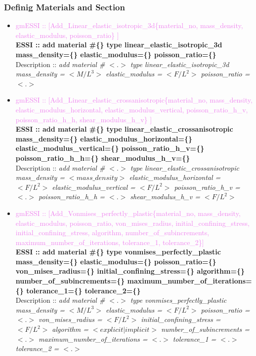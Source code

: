 \documentclass[11pt]{article}
\begin{document}
\subsubsection{Definig Materials and Section}

    \begin{itemize}

      \item \textcolor{violet}{gmESSI :: [Add\_Linear\_elastic\_isotropic\_3d\{material\_no, mass\_density, elastic\_modulus, poisson\_ratio\} ]}\\
      \textbf{ESSI :: add material \#\{\} type linear\_elastic\_isotropic\_3d mass\_density=\{\} elastic\_modulus=\{\} poisson\_ratio=\{\} } \\
      Description ::  \textit{ add material \# $<.>$ type linear\_elastic\_isotropic\_3d mass\_density = $<M/L^3>$ elastic\_modulus = $<F/L^2>$ poisson\_ratio = $<.>$}

      \item \textcolor{violet}{gmESSI :: [Add\_Linear\_elastic\_crossanisotropic\{material\_no, mass\_density, elastic\_modulus\_horizontal, elastic\_modulus\_vertical, poisson\_ratio\_h\_v, poisson\_ratio\_h\_h, shear\_modulus\_h\_v\} ]}\\
      \textbf{ESSI :: add material \#\{\} type linear\_elastic\_crossanisotropic mass\_density=\{\} elastic\_modulus\_horizontal=\{\} elastic\_modulus\_vertical=\{\} poisson\_ratio\_h\_v=\{\} poisson\_ratio\_h\_h=\{\} shear\_modulus\_h\_v=\{\} }\\
      Description ::  \textit{ add material \# $<.>$ type linear\_elastic\_crossanisotropic mass\_density = $<mass\_density>$ elastic\_modulus\_horizontal = $<F/L^2>$ elastic\_modulus\_vertical = $<F/L^2>$ poisson\_ratio\_h\_v = $<.>$ poisson\_ratio\_h\_h = $<.>$ shear\_modulus\_h\_v = $<F/L^2>$}

      \item \textcolor{violet}{gmESSI :: [Add\_Vonmises\_perfectly\_plastic\{material\_no, mass\_density, elastic\_modulus, poisson\_ratio, von\_mises\_radius, initial\_confining\_stress, initial\_confining\_stress, algorithm, number\_of\_subincrements, maximum\_number\_of\_iterations, tolerance\_1, tolerance\_2\}]}\\
      \textbf{ESSI :: add material \#\{\} type vonmises\_perfectly\_plastic mass\_density=\{\} elastic\_modulus=\{\} poisson\_ratio=\{\}  von\_mises\_radius=\{\} initial\_confining\_stress=\{\} algorithm=\{\} number\_of\_subincrements=\{\} maximum\_number\_of\_iterations=\{\} tolerance\_1=\{\} tolerance\_2=\{\} } \\
      Description ::  \textit{ add material \# $<.>$ type vonmises\_perfectly\_plastic mass\_density = $<M/L^3>$ elastic\_modulus = $<F/L^2>$ poisson\_ratio = $<.>$ von\_mises\_radius = $<F/L^2>$ initial\_confining\_stress = $<F/L^2>$ algorithm = $<explicit|implicit>$ number\_of\_subincrements = $<.>$ maximum\_number\_of\_iterations = $<.>$ tolerance\_1 = $<.>$ tolerance\_2 = $<.>$} 


\end{itemize}
\end{document}
